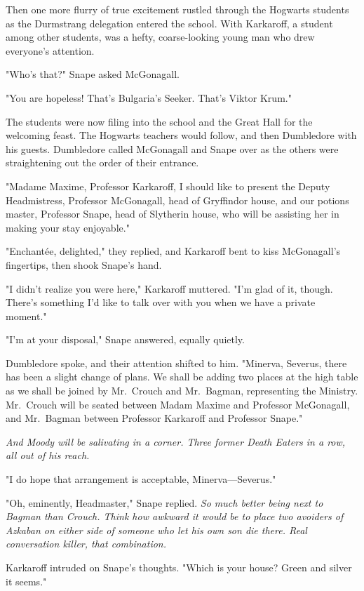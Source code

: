Then one more flurry of true excitement rustled through the Hogwarts students as the Durmstrang delegation entered the school. With Karkaroff, a student among other students, was a hefty, coarse-looking young man who drew everyone's attention.

"Who's that?" Snape asked McGonagall.

"You are hopeless! That's Bulgaria's Seeker. That's Viktor Krum."

The students were now filing into the school and the Great Hall for the welcoming feast. The Hogwarts teachers would follow, and then Dumbledore with his guests. Dumbledore called McGonagall and Snape over as the others were straightening out the order of their entrance.

"Madame Maxime, Professor Karkaroff, I should like to present the Deputy Headmistress, Professor McGonagall, head of Gryffindor house, and our potions master, Professor Snape, head of Slytherin house, who will be assisting her in making your stay enjoyable."

"Enchantée, delighted," they replied, and Karkaroff bent to kiss McGonagall's fingertips, then shook Snape's hand.

"I didn't realize you were here," Karkaroff muttered. "I'm glad of it, though. There's something I'd like to talk over with you when we have a private moment."

"I'm at your disposal," Snape answered, equally quietly.

Dumbledore spoke, and their attention shifted to him. "Minerva, Severus, there has been a slight change of plans. We shall be adding two places at the high table as we shall be joined by Mr.~Crouch and Mr.~Bagman, representing the Ministry. Mr.~Crouch will be seated between Madam Maxime and Professor McGonagall, and Mr.~Bagman between Professor Karkaroff and Professor Snape."

\emph{And Moody will be salivating in a corner. Three former Death Eaters in a row, all out of his reach.}

"I do hope that arrangement is acceptable, Minerva—Severus."

"Oh, eminently, Headmaster," Snape replied. \emph{So much better being next to Bagman than Crouch. Think how awkward it would be to place two avoiders of Azkaban on either side of someone who let his own son die there. Real conversation killer, that combination.}

Karkaroff intruded on Snape's thoughts. "Which is your house? Green and silver it seems."


